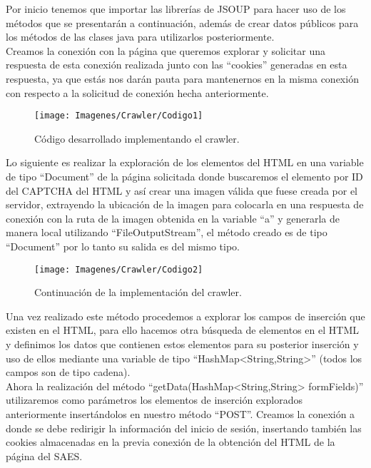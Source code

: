 	\noindent Por inicio tenemos que importar las librerías de JSOUP para hacer uso de los métodos que se presentarán a continuación, además de crear datos públicos para los métodos de las clases java para utilizarlos posteriormente.\\
	\noindent Creamos la conexión con la página que queremos explorar y solicitar una respuesta de esta conexión realizada junto con las “cookies” generadas en esta respuesta, ya que estás nos darán pauta para mantenernos en la misma conexión con respecto a la solicitud de conexión hecha anteriormente. \\
	
	\begin{figure} [hbt!]
		\centering
		\texttt{[image: Imagenes/Crawler/Codigo1]}
		\caption{Código desarrollado implementando el crawler.}
		\label{codigo1}
	\end{figure}
	
	\noindent Lo siguiente es realizar la exploración de los elementos del HTML en una variable de tipo “Document” de la página solicitada donde buscaremos el elemento por ID del CAPTCHA del HTML y así crear una imagen válida que fuese creada por el servidor, extrayendo la ubicación de la imagen para colocarla en una respuesta de conexión con la ruta de la imagen obtenida en la variable “a” y generarla de manera local utilizando “FileOutputStream”, el método creado es de tipo “Document” por lo tanto su salida es del mismo tipo. 
	\pagebreak
	
	\begin{figure} [hbt!]
		\centering
		\texttt{[image: Imagenes/Crawler/Codigo2]}
		\caption{Continuación de la implementación del crawler.}
		\label{codigo2}
	\end{figure}
	
	\noindent Una vez realizado este método procedemos a explorar los campos de inserción que existen en el HTML, para ello hacemos otra búsqueda de elementos en el HTML y definimos los datos que contienen estos elementos para su posterior inserción y uso de ellos mediante una variable de tipo “HashMap<String,String>” (todos los campos son de tipo cadena).\\
	
	\noindent Ahora la realización del método “getData(HashMap<String,String> formFields)” utilizaremos como parámetros los elementos de inserción explorados anteriormente insertándolos en nuestro método “POST”. Creamos la conexión a donde se debe redirigir la información del inicio de sesión, insertando también las cookies almacenadas en la previa conexión de la obtención del HTML de la página del SAES.\\
	
